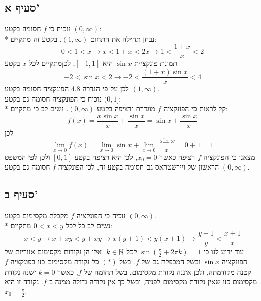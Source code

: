 \subsection{סעיף א'}
נוכיח כי $f$ חסומה בקטע $(0, \infty)$: \\*
נבחן תחילה את התחום $(1, \infty)$. בקטע זה מתקיים:
\[
	0 < 1 < x \rightarrow
	x < 1 + x < 2x \rightarrow
	1 < \frac{1 + x}{x} < 2 \tag{\#}
\]
תמונת פונקציית $\sin x$ היא $[-1, 1]$, לכןמתקיים לכל $x$ בקטע
\[
	-2 < \sin x < 2 \rightarrow -2 < \frac{(1 + x) \sin x}{x} < 4
\]
לכן על־פי הגדרה 4.8 הפונקציה חסומה בקטע $(1, \infty)$. \\
נוכיח כי הפונקציה חסומה גם בקטע $(0, 1]$: \\* %
קל לראות כי הפונקציה $f$ מוגדרת ורציפה בקטע $(0, \infty)$. 
נשים לב כי מתקיים:
\[
	f(x) = \frac{x \sin x}{x} + \frac{\sin x}{x} = \sin x + \frac{\sin x}{x}
\]
לכן
\[
	\lim_{x \to 0} f(x) = \lim_{x \to 0} \sin x + \lim_{x \to 0} \frac{\sin x}{x} = 0 + 1 = 1
\]
מצאנו כי הפונקציה $f$ רציפה כאשר $x_0 = 0$, לכן היא רציפה בקטע $[0, 1]$ ולכן לפי המשפט הראשון של ויירשטראס גם חסומה בקטע זה,
לכן הפונקציה $f$ חסומה גם בקטע $(0, \infty)$.

\subsection{סעיף ב'}
נוכיח כי הפונקציה $f$ מקבלת מקסימום בקטע $(0, \infty)$. \\*
נשים לב כל לכל $0 < x < y$ מתקיים:
\[
	x < y \rightarrow
	x + xy < y + xy \rightarrow
	x (y + 1) < y (x + 1) \rightarrow
	\frac{y + 1}{y} < \frac{x + 1}{x} \tag{*}
\]
עוד ידוע לנו כי $\sin(\frac{\pi}{2} + 2\pi k) = 1$ לכל $k \in \mathbb{N}$.
אלו הן נקודות מקסימום אזוריות של הפונקציה $\sin x$ ובשל המכפלה גם של $f$.
בשל $(*)$ כל נקודת מקסימום כזו בפונקציה $f$ קטנה מקודמתה, ולכן איננה נקודת מקסימום.
בשל תחומה של $f$, כאשר $k = 0$ ישנה נקודת מקסימום כזו שאין נקודת מקסימום לפניה, ובשל כך אין נקודה גדולה ממנה ב־$f$.
נקודה זו היא $x_0 = \frac{\pi}{2}$.


